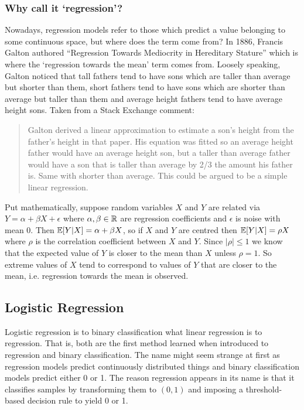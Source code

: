 \documentclass[11pt]{article}
\begin{document}
\subsubsection{Why call it `regression'?}
Nowadays, regression models refer to those which predict a value belonging to some continuous space, but where does the term come from? In 1886, Francis Galton authored ``Regression Towards Mediocrity in Hereditary Stature'' which is where the `regression towards the mean' term comes from. Loosely speaking, Galton noticed that tall fathers tend to have sons which are taller than average but shorter than them, short fathers tend to have sons which are shorter than average but taller than them and average height fathers tend to have average height sons. Taken from a Stack Exchange comment:
\begin{quotation}
    Galton derived a linear approximation to estimate a son's height from the father's height in that paper. His equation was fitted so an average height father would have an average height son, but a taller than average father would have a son that is taller than average by 2/3 the amount his father is. Same with shorter than average. This could be argued to be a simple linear regression.
\end{quotation}
Put mathematically, suppose random variables $X$ and $Y$ are related via $Y=\alpha+\beta X+\epsilon$ where $\alpha,\beta\in\mathbb{R}$ are regression coefficients and $\epsilon$ is noise with mean $0$. Then $\mathbb{E}[Y|X]=\alpha+\beta X$, so if $X$ and $Y$ are centred then $\mathbb{E}[Y|X]=\rho X$ where $\rho$ is the correlation coefficient between $X$ and $Y$. Since $|\rho|\leq1$ we know that the expected value of $Y$ is closer to the mean than $X$ unless $\rho=1$. So extreme values of $X$ tend to correspond to values of $Y$ that are closer to the mean, i.e. regression towards the mean is observed.

\subsection{Logistic Regression}

Logistic regression is to binary classification what linear regression is to regression. That is, both are the first method learned when introduced to regression and binary classification. The name might seem strange at first as regression models predict continuously distributed things and binary classification models predict either 0 or 1. The reason regression appears in its name is that it classifies samples by transforming them to $(0,1)$ and imposing a threshold-based decision rule to yield 0 or 1.
\end{document}

